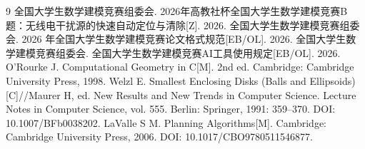 \begin{thebibliography}{9}
全国大学生数学建模竞赛组委会. 2026年高教社杯全国大学生数学建模竞赛B题：无线电干扰源的快速自动定位与清除[Z]. 2026.
全国大学生数学建模竞赛组委会. 2026 年全国大学生数学建模竞赛论文格式规范[EB/OL]. 2026.
全国大学生数学建模竞赛组委会. 全国大学生数学建模竞赛AI工具使用规定[EB/OL]. 2026.
O'Rourke J. Computational Geometry in C[M]. 2nd ed. Cambridge: Cambridge University Press, 1998.
Welzl E. Smallest Enclosing Disks (Balls and Ellipsoids)[C]//Maurer H, ed. New Results and New Trends in Computer Science. Lecture Notes in Computer Science, vol. 555. Berlin: Springer, 1991: 359--370. DOI: 10.1007/BFb0038202.
LaValle S M. Planning Algorithms[M]. Cambridge: Cambridge University Press, 2006. DOI: 10.1017/CBO9780511546877.
\end{thebibliography}
